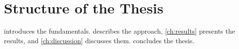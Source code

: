 \section{Structure of the Thesis}
\label{sec:outline}

 introduces the fundamentals.
 describes the approach,
\cref{ch:results} presents the results, and
\cref{ch:discussion} discusses them.
 concludes the thesis.

